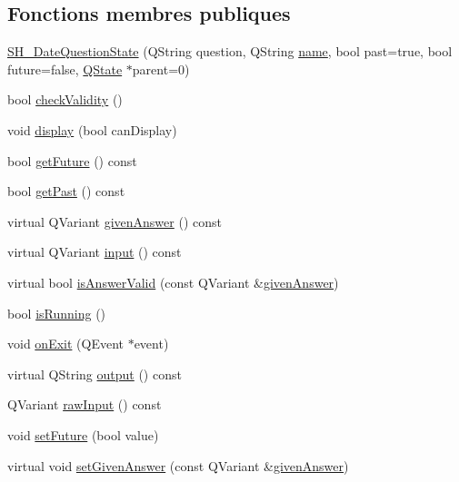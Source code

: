 \subsection*{Fonctions membres publiques}
\begin{DoxyCompactItemize}
\item 
\hyperlink{classSH__DateQuestionState_a9a60060ebcd5994d62f0ca5f0e6b5e98}{S\-H\-\_\-\-Date\-Question\-State} (Q\-String question, Q\-String \hyperlink{classSH__NamedObject_a9f686c6f2a5bcc08ad03d0cee0151f0f}{name}, bool past=true, bool future=false, \hyperlink{classQState}{Q\-State} $\ast$parent=0)
\item 
bool \hyperlink{classSH__QuestionState_a902be003650c33d954d707b2d3ee0bb9}{check\-Validity} ()
\item 
void \hyperlink{classSH__InOutState_a616f88b20478b81b2927a9ddc2b4f521}{display} (bool can\-Display)
\item 
bool \hyperlink{classSH__DateQuestionState_aa7b73f952558aa2aefaec2b94119abbc}{get\-Future} () const 
\item 
bool \hyperlink{classSH__DateQuestionState_a409a85ad6b7d2e37cfc42c3cfdca12ad}{get\-Past} () const 
\item 
virtual Q\-Variant \hyperlink{classSH__QuestionState_a29cdea8bc55e39e3ed02d24743c30f8c}{given\-Answer} () const 
\item 
virtual Q\-Variant \hyperlink{classSH__InOutState_a8e1b78069343122df7713624a1a5a100}{input} () const 
\item 
virtual bool \hyperlink{classSH__DateQuestionState_a303e9f86c37ded79fb3ad4d31d183c21}{is\-Answer\-Valid} (const Q\-Variant \&\hyperlink{classSH__QuestionState_a29cdea8bc55e39e3ed02d24743c30f8c}{given\-Answer})
\item 
bool \hyperlink{classSH__GenericState_a5f731810dad0cacd28828ccbf1539e4e}{is\-Running} ()
\item 
void \hyperlink{classSH__InOutState_afc0433d63375063a43e39adca641e330}{on\-Exit} (Q\-Event $\ast$event)
\item 
virtual Q\-String \hyperlink{classSH__InOutState_a17ed7eaf5e3ed5af80a4f9fe65d5bfd9}{output} () const 
\item 
Q\-Variant \hyperlink{classSH__DateQuestionState_a71917e94cb9ce692f916a848bc8c8892}{raw\-Input} () const 
\item 
void \hyperlink{classSH__DateQuestionState_acda6fa1cdc24ad7c5c012d88c948b819}{set\-Future} (bool value)
\item 
virtual void \hyperlink{classSH__QuestionState_a8fec0a91aed0b2b1699db17169873eb0}{set\-Given\-Answer} (const Q\-Variant \&\hyperlink{classSH__QuestionState_a29cdea8bc55e39e3ed02d24743c30f8c}{given\-Answer})

\end{DoxyCompactItemize}
